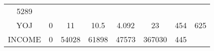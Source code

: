\documentclass[]{article}
\begin{document}
\begin{longtable}[]{@{}cccccccc@{}}
\begin{minipage}[t]{0.14\columnwidth}
5289\strut
\end{minipage}\tabularnewline
\begin{minipage}[t]{0.11\columnwidth}\centering\strut
YOJ\strut
\end{minipage} & \begin{minipage}[t]{0.07\columnwidth}\centering\strut
0\strut
\end{minipage} & \begin{minipage}[t]{0.09\columnwidth}\centering\strut
11\strut
\end{minipage} & \begin{minipage}[t]{0.09\columnwidth}\centering\strut
10.5\strut
\end{minipage} & \begin{minipage}[t]{0.09\columnwidth}\centering\strut
4.092\strut
\end{minipage} & \begin{minipage}[t]{0.09\columnwidth}\centering\strut
23\strut
\end{minipage} & \begin{minipage}[t]{0.13\columnwidth}\centering\strut
454\strut
\end{minipage} & \begin{minipage}[t]{0.14\columnwidth}\centering\strut
625\strut
\end{minipage}\tabularnewline
\begin{minipage}[t]{0.11\columnwidth}\centering\strut
INCOME\strut
\end{minipage} & \begin{minipage}[t]{0.07\columnwidth}\centering\strut
0\strut
\end{minipage} & \begin{minipage}[t]{0.09\columnwidth}\centering\strut
54028\strut
\end{minipage} & \begin{minipage}[t]{0.09\columnwidth}\centering\strut
61898\strut
\end{minipage} & \begin{minipage}[t]{0.09\columnwidth}\centering\strut
47573\strut
\end{minipage} & \begin{minipage}[t]{0.09\columnwidth}\centering\strut
367030\strut
\end{minipage} & \begin{minipage}[t]{0.13\columnwidth}\centering\strut
445\strut
\end{minipage} & \begin{minipage}[t]{0.14\columnwidth}\centering\strut

\end{minipage}
\end{longtable}
\end{document}
